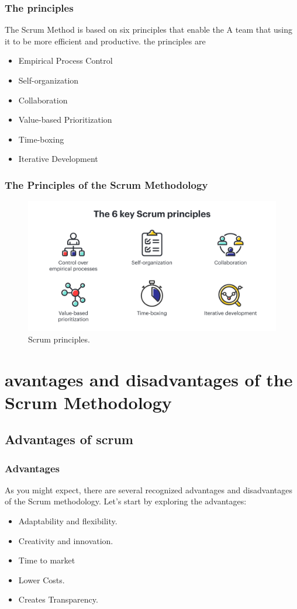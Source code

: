 \documentclass[
	11pt, %
]{beamer}
\begin{document}
\begin{frame}
	\frametitle{The principles}
	The Scrum Method is based on six principles that enable the 
	A team that using it to be more efficient and productive.
	the principles are  
	\begin{itemize}
		\item Empirical Process Control
		\item Self-organization
		\item Collaboration
		\item Value-based Prioritization
		\item Time-boxing
		\item Iterative Development
	\end{itemize}
\end{frame}

\begin{frame}
	\frametitle{The Principles of the Scrum Methodology}
	\begin{figure}
		\includegraphics[width=0.8\linewidth]{principles.png}
		\caption{Scrum principles.}
	\end{figure}
\end{frame}

% 



\section{avantages and disadvantages of the Scrum Methodology}
\subsection{Advantages of scrum}
\begin{frame}
	\frametitle{Advantages}
	As you might expect, there are several recognized advantages and disadvantages of the Scrum methodology. Let's start by exploring the advantages:
	\\
	\begin{itemize} 
		\item Adaptability and flexibility.
		\item Creativity and innovation.
		\item Time to market
		\item Lower Costs.
		\item Creates Transparency.
	\end{itemize}
\end{frame}
\end{document}
